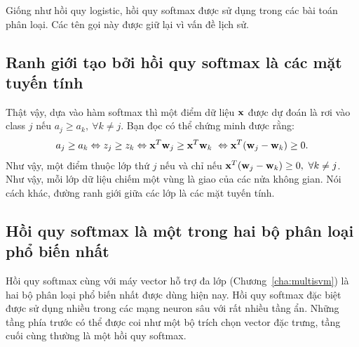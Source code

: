 {Giống như hồi quy logistic, hồi quy softmax được sử dụng trong các bài toán
phân loại}. Các tên gọi này được giữ lại vì vấn đề lịch sử.


\subsection{Ranh giới tạo bởi hồi quy softmax là các mặt tuyến tính}
Thật vậy, dựa vào hàm softmax thì một điểm dữ liệu $\mathbf{x}$ được dự đoán là rơi vào class $j$ nếu $a_{j} \geq a_{k}, ~\forall k \neq j$. Bạn đọc có thể chứng minh được rằng:
\begin{equation}
a_{j} \geq a_{k} \Leftrightarrow z_{j} \geq z_{k} \Leftrightarrow \mathbf{x}^T\mathbf{w}_j \geq \mathbf{x}^T\mathbf{w}_k\\\
\Leftrightarrow \mathbf{x}^T(\mathbf{w}_j - \mathbf{w}_k) \geq 0.
\end{equation}
Như vậy, một điểm thuộc lớp thứ $j$ nếu và chỉ nếu $\mathbf{x}^T(\mathbf{w}_j - \mathbf{w}_k) \geq
0,~\forall k \neq j$. Như vậy, mỗi lớp dữ liệu chiếm một vùng là giao
của các nửa không gian. Nói cách khác, đường ranh giới giữa các lớp là các
mặt tuyến tính.


\subsection{Hồi quy softmax là một trong hai bộ phân loại phổ biến nhất}
Hồi quy softmax cùng với máy vector hỗ trợ đa lớp
(Chương~\ref{cha:multisvm}) là hai bộ phân loại phổ biến nhất được dùng hiện nay.
Hồi quy softmax đặc biệt được sử dụng nhiều trong các mạng neuron sâu với
rất nhiều tầng ẩn. Những tầng phía trước có thể được coi như một bộ trích chọn
vector đặc trưng, tầng cuối cùng thường là một hồi quy softmax.



